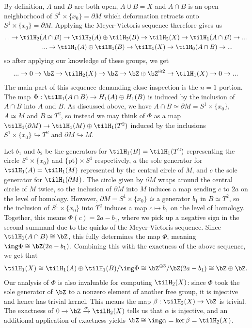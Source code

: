 \begin{homework}[e]
\begin{prf}
    By definition, $A$ and $B$ are both open, $A \cup B = X$ and $A\cap B$ is an open neighborhood of $S^1\times \{x_0\} = \partial M$ which deformation retracts onto $S^1\times \{x_0\} = \partial M$. Applying the Meyer-Vietoris sequence therefore gives us
    \begin{align*}
      ... \to \tilH_2(&A\cap B) \to\tilH_2(A) \oplus \tilH_2(B) \to \tilH_2(X) \to \tilH_1(A\cap B) \to ... \\
        &...\to \tilH_1(A)\oplus \tilH_1(B) \to \tilH_1(X) \to \tilH_0(A\cap B) \to ...
    \end{align*}
    so after applying our knowledge of these groups, we get
    \begin{align*}
      ... \to 0 \to \bZ \to \tilH_2(X) \to \bZ\to  \bZ\oplus \bZ^{\oplus 2} \to \tilH_1(X) \to 0 \to ...
    \end{align*}
    The main part of this sequence demanding close inspection is the $n = 1$ portion. The map $\Phi:\tilH_1(A\cap B) \to H_1(A) \oplus H_1(B)$ is induced by the inclusion of $A\cap B$ into $A$ and $B$. As discussed above, we have $A\cap B \simeq \partial M = S^1\times \{x_0\}$, $A \simeq M$ and $B \simeq T^2$, so instead we may think of $\Phi$ as a map $\tilH_1(\partial M) \to \tilH_1(M)\oplus \tilH_1(T^2)$ induced by the inclusions $S^1\times \{x_0\}\hookrightarrow T^2$ and $\partial M \hookrightarrow M$.

    Let $b_1$  and $b_2$ be the generators for $\tilH_1(B) = \tilH_1(T^2)$ representing the circle $S^1\times \{x_0\}$ and $\{\text{pt}\}\times S^1$ respectively, $a$ the sole generator for $\tilH_1(A) = \tilH_1(M)$ represented by the central circle of $M$, and $c$ the sole generator for $\tilH_1(\partial M)$. The circle given by $\partial M$ wraps around the central circle of $M$ twice, so the inclusion of $\partial M$ into $M$ induces a map sending $c$ to $2a$ on the level of homology. However, $\partial M = S^1\times \{x_0\}$ \emph{is} a generator $b_1$ in $B \simeq T^2$, so the inclusion of $S^1\times \{x_0\}$ into $T^2$ induces a map $c \mapsto b_1$ on the level of homology. Together, this means $\Phi(c) = 2a - b_1$, where we pick up a negative sign in the second summand due to the quirks of the Meyer-Vietoris sequence. Since $\tilH_1(A\cap B) \cong \bZ$, this fully determines the map $\Phi$, meaning $\img \Phi \cong \bZ(2a - b_1)$. Combining this with the exactness of the above sequence, we get that
    \begin{align*}
      \tilH_1(X) \cong \tilH_1(A) \oplus \tilH_1(B)/\img \Phi \cong \bZ^{\oplus 3}/\bZ(2a - b_1) \cong \bZ\oplus \bZ.
    \end{align*}
    Our analysis of $\Phi$ is also invaluable for computing $\tilH_2(X)$: since $\Phi$ took the sole generator of $\bZ$ to a nonzero element of another free group, it is injective and hence has trivial kernel. This means the map $\beta:\tilH_2(X)\to \bZ$ is trivial. The exactness of $0 \to \bZ \xrightarrow{\alpha}\tilH_2(X)$ tells us that $\alpha$ is injective, and an additional application of exactness yields $\bZ \cong \img \alpha = \ker \beta = \tilH_2(X)$.


\end{prf}
\end{homework}
